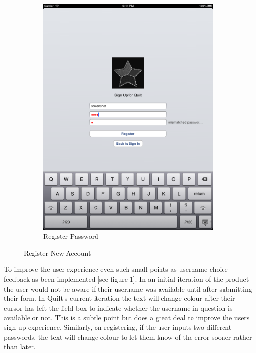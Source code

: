\documentclass[a4wide, 10pt]{article}
\begin{document}
\begin{figure}
\begin{subfigure}[b]{0.4\textwidth}
                \includegraphics[width=\textwidth]{"screenshots/Incorrect Pass"}
                \caption{Register Password}
        \end{subfigure}
        \caption{Register New Account}\label{fig:login}
\end{figure}

To improve the user experience even such small points as username choice feedback as been implemented [see figure 1]. In an initial iteration of the product the user would not be aware if their username was available until after submitting their form. In Quilt's current iteration the text will change colour after their cursor has left the field box to indicate whether the username in question is available or not. This is a subtle point but does a great deal to improve the users sign-up experience. Similarly, on registering, if the user inputs two different passwords, the text will change colour to let them know of the error sooner rather than later.
\end{document}
